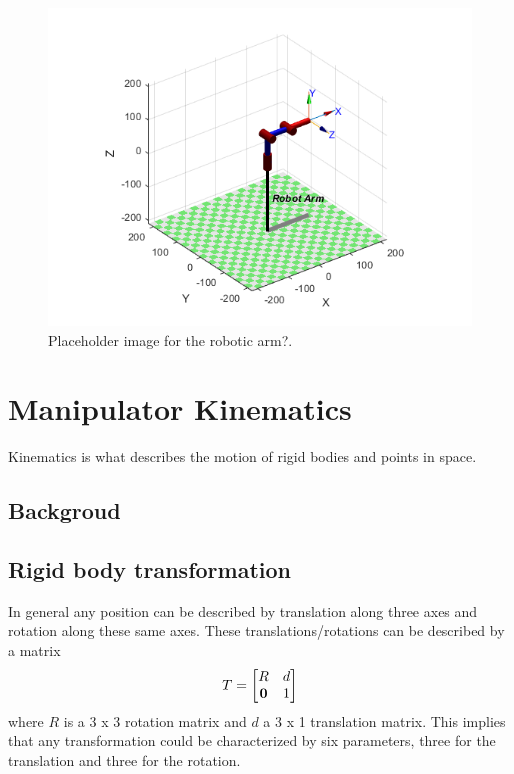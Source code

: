 


\begin{figure}[H]
    \centering
    \includegraphics[width=0.7\columnwidth]{chapters/img/robot_arm.png}
    \caption{Placeholder image for the robotic arm?.}
    \label{fig:robotic_manipulator_general}
\end{figure}


\section*{Manipulator Kinematics} %
Kinematics is what describes the motion of rigid bodies and points in space. 

\subsection*{Backgroud}
\subsection*{Rigid body transformation}
In general any position can be described by translation along three axes and rotation along these same axes. These translations/rotations can be described by a matrix
\begin{equation}
    T = 
    \begin{bmatrix}
        R & d \\
        \bf{0} & 1
    \end{bmatrix}
\end{equation}
where \(R\) is a 3 x 3 rotation matrix and \(d\) a 3 x 1 translation matrix. This implies that any transformation could be characterized by six parameters, three for the translation and three for the rotation. \cite{spong}


